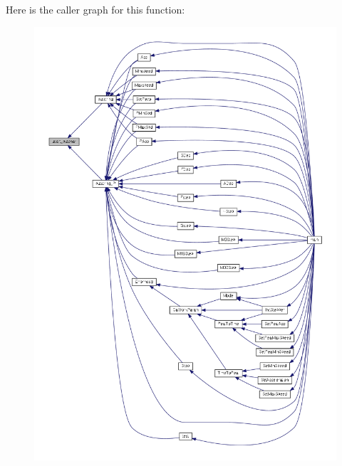 Here is the caller graph for this function\-:
\nopagebreak
\begin{figure}[H]
\begin{center}
\leavevmode
\includegraphics[width=350pt]{group__pfleury__uart_ga5db1b15d2f108232a6162b87c9fb352e_icgraph}
\end{center}
\end{figure}


